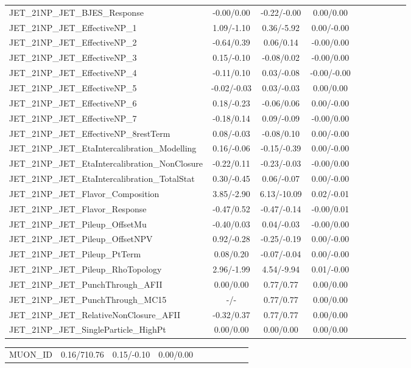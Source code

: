 \begin{table}[h]
\begin{center}
\begin{tabular}{l|ccccccccc}
JET\_21NP\_JET\_BJES\_Response &-0.00/0.00 &-0.22/-0.00 &0.00/0.00 \\
JET\_21NP\_JET\_EffectiveNP\_1 &1.09/-1.10 &0.36/-5.92 &0.00/-0.00 \\
JET\_21NP\_JET\_EffectiveNP\_2 &-0.64/0.39 &0.06/0.14 &-0.00/0.00 \\
JET\_21NP\_JET\_EffectiveNP\_3 &0.15/-0.10 &-0.08/0.02 &-0.00/0.00 \\
JET\_21NP\_JET\_EffectiveNP\_4 &-0.11/0.10 &0.03/-0.08 &-0.00/-0.00 \\
JET\_21NP\_JET\_EffectiveNP\_5 &-0.02/-0.03 &0.03/-0.03 &0.00/0.00 \\
JET\_21NP\_JET\_EffectiveNP\_6 &0.18/-0.23 &-0.06/0.06 &0.00/-0.00 \\
JET\_21NP\_JET\_EffectiveNP\_7 &-0.18/0.14 &0.09/-0.09 &-0.00/0.00 \\
JET\_21NP\_JET\_EffectiveNP\_8restTerm &0.08/-0.03 &-0.08/0.10 &0.00/-0.00 \\
JET\_21NP\_JET\_EtaIntercalibration\_Modelling &0.16/-0.06 &-0.15/-0.39 &0.00/-0.00 \\
JET\_21NP\_JET\_EtaIntercalibration\_NonClosure &-0.22/0.11 &-0.23/-0.03 &-0.00/0.00 \\
JET\_21NP\_JET\_EtaIntercalibration\_TotalStat &0.30/-0.45 &0.06/-0.07 &0.00/-0.00 \\
JET\_21NP\_JET\_Flavor\_Composition &3.85/-2.90 &6.13/-10.09 &0.02/-0.01 \\
JET\_21NP\_JET\_Flavor\_Response &-0.47/0.52 &-0.47/-0.14 &-0.00/0.01 \\
JET\_21NP\_JET\_Pileup\_OffsetMu &-0.40/0.03 &0.04/-0.03 &-0.00/0.00 \\
JET\_21NP\_JET\_Pileup\_OffsetNPV &0.92/-0.28 &-0.25/-0.19 &0.00/-0.00 \\
JET\_21NP\_JET\_Pileup\_PtTerm &0.08/0.20 &-0.07/-0.04 &0.00/-0.00 \\
JET\_21NP\_JET\_Pileup\_RhoTopology &2.96/-1.99 &4.54/-9.94 &0.01/-0.00 \\
JET\_21NP\_JET\_PunchThrough\_AFII &0.00/0.00 &0.77/0.77 &0.00/0.00 \\
JET\_21NP\_JET\_PunchThrough\_MC15 &-/- &0.77/0.77 &0.00/0.00 \\
JET\_21NP\_JET\_RelativeNonClosure\_AFII &-0.32/0.37 &0.77/0.77 &0.00/0.00 \\
JET\_21NP\_JET\_SingleParticle\_HighPt &0.00/0.00 &0.00/0.00 &0.00/0.00 \\
\hline \end{tabular} \end{center} \end{table} \begin{table}[h] \scriptsize \begin{center} \begin{tabular}{l|ccccccccc} \hline MUON\_ID &0.16/710.76 &0.15/-0.10 &0.00/0.00 \\

\end{tabular}
\end{center}
\end{table}
